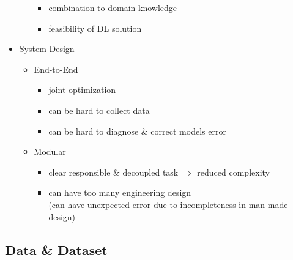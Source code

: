\begin{itemize}
\begin{itemize}
\begin{itemize}
		\item combination to domain knowledge
		\item feasibility of DL solution
		\end{itemize}
	\end{itemize}
\item System Design
	\begin{itemize}
	\item End-to-End
		\begin{itemize}
		\item joint optimization
		\item can be hard to collect data
		\item can be hard to diagnose \& correct models error
		\end{itemize}
	\item Modular
		\begin{itemize}
		\item clear responsible \& decoupled task $\Rightarrow$ reduced complexity
		\item can have too many engineering design \\
		(can have unexpected error due to incompleteness in man-made design)
		\end{itemize}
	\end{itemize}
\end{itemize}

\subsection{Data \& Dataset}
